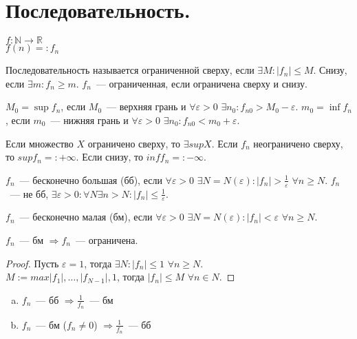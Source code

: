 \documentclass[12pt]{article}
\begin{document}
	\tableofcontents
	\setcounter{tocdepth}{3}
	\newpage
	\section{Последовательность.}
	$f: \mathbb{N} \rightarrow \mathbb{R}$ \\
	$f(n) =: f_n$
	\begin{definition}
		Последовательность называется ограниченной сверху, если $\exists M: |f_n| \leqslant M$. Снизу, если $\exists m:  f_n \geqslant m$. $f_n$~--- ограниченная, если ограничена сверху и снизу.
	\end{definition}
	\begin{definition}
		$M_0 = \sup f_n$, если $M_0$~--- верхняя грань и $\forall \varepsilon > 0$ $\exists n_0: f_{n0} > M_0 - \varepsilon$. $m_0 = \inf f_n$, если $m_0$~--- нижняя грань и $\forall \varepsilon > 0$ $\exists n_0: f_{n0} < m_0 + \varepsilon$.
	\end{definition}
	\begin{axiom}
		Если множество $X$ ограничено сверху, то $\exists sup X$. Если $f_n$ неограничено сверху, то $sup f_n =: + \infty$. Если снизу, то $inf f_n =: - \infty$.
	\end{axiom}
	\begin{definition}
		$f_n$~--- бесконечно большая (бб), если $\forall \varepsilon > 0$ $\exists N = N(\varepsilon): |f_n| > \frac{1}{\varepsilon}$ $\forall n \geqslant N$. $f_n$~--- не бб, $\exists \varepsilon > 0: \forall N \exists n > N: |f_n| \leqslant \frac{1}{\varepsilon}$.
	\end{definition}
	\begin{definition}
		$f_n$~--- бесконечно малая (бм), если $\forall \varepsilon > 0$ $\exists N = N(\varepsilon): |f_n| <\varepsilon$ $\forall n \geqslant N$.
	\end{definition}
	\begin{lemma}
		$f_n$~--- бм $\Rightarrow f_n$~--- ограничена.
	\end{lemma}
	\begin{proof}
		Пусть $\varepsilon = 1$, тогда $\exists N: |f_n| \leqslant 1$ $\forall n \geqslant N$. \\
		$M := max{|f_1|, \dots, |f_{N - 1}|, 1}$, тогда $|f_n| \leqslant M$ $\forall n \in N$.
	\end{proof}
	\begin{lemma}
		\begin{enumerate}[a)]
			\item $f_n$~--- бб $\Rightarrow \frac{1}{f_n}$~--- бм
			\item $f_n$~--- бм ($f_n \not= 0$) $\Rightarrow \frac{1}{f_n}$~--- бб
		\end{enumerate}
	\end{lemma}
\end{document}
